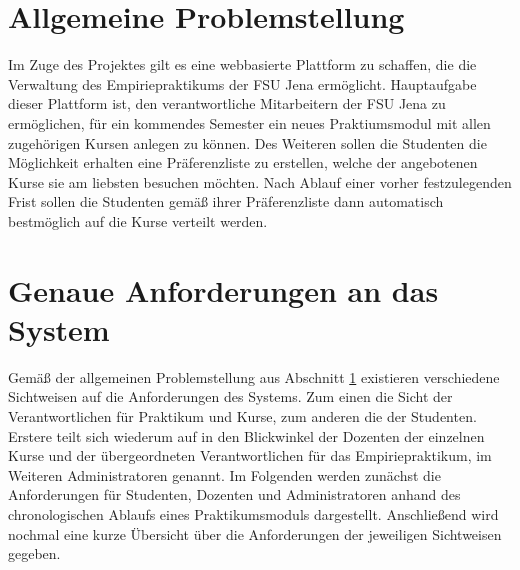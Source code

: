 \section{Allgemeine Problemstellung}
\label{Problemstellung}
    Im Zuge des Projektes gilt es eine webbasierte Plattform zu schaffen, die die Verwaltung des Empiriepraktikums der FSU Jena ermöglicht.
    Hauptaufgabe dieser Plattform ist, den verantwortliche Mitarbeitern der FSU Jena zu ermöglichen, für ein kommendes Semester ein neues Praktiumsmodul mit allen zugehörigen Kursen anlegen zu können.
    Des Weiteren sollen die Studenten die Möglichkeit erhalten eine Präferenzliste zu erstellen, welche der angebotenen Kurse sie am liebsten besuchen möchten.
    Nach Ablauf einer vorher festzulegenden Frist sollen die Studenten gemäß ihrer Präferenzliste dann automatisch bestmöglich auf die Kurse verteilt werden.     

\section{Genaue Anforderungen an das System}
    Gemäß der allgemeinen Problemstellung aus Abschnitt \ref{Problemstellung} existieren verschiedene Sichtweisen auf die Anforderungen des Systems.
    Zum einen die Sicht der Verantwortlichen für Praktikum und Kurse, zum anderen die der Studenten.
    Erstere teilt sich wiederum auf in den Blickwinkel der Dozenten der einzelnen Kurse und der übergeordneten Verantwortlichen für das Empiriepraktikum, im Weiteren Administratoren genannt.
    Im Folgenden werden zunächst die Anforderungen für Studenten, Dozenten und Administratoren anhand des chronologischen Ablaufs eines Praktikumsmoduls dargestellt.
    Anschließend wird nochmal eine kurze Übersicht über die Anforderungen der jeweiligen Sichtweisen gegeben.
    
